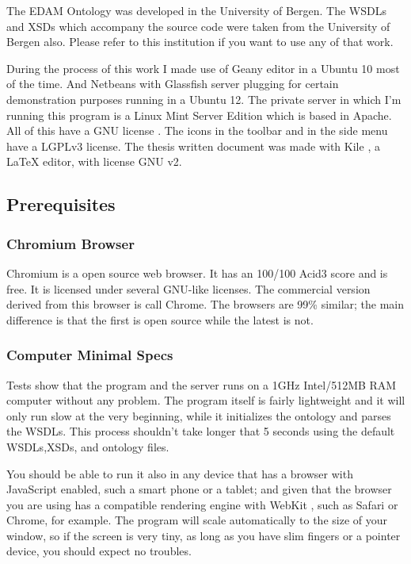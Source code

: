 \documentclass[a4paper,10pt]{article}
\begin{document}
  The EDAM Ontology was developed in the University of Bergen. The WSDLs and XSDs which accompany the source code were taken from the University of Bergen also. Please refer to this institution if you want to use any of that work.\vspace{3 mm}

  During the process of this work I made use of Geany \cite{geany} editor in a Ubuntu 10 \cite{ubuntu} most of the time. And Netbeans \cite{netbeans} with Glassfish \cite{glassfish} server plugging for certain demonstration purposes running in a Ubuntu 12. The private server in which I'm running this program is a Linux Mint Server Edition \cite{mint} which is based in Apache. All of this have a GNU license \cite{gpl}. The icons in the toolbar and in the side menu have a LGPLv3 \cite{lgpl} license. The thesis written document was made with Kile \cite{kile}, a LaTeX editor, with license GNU v2.\vspace{3 mm}

  \subsection{Prerequisites}
    \subsubsection{Chromium Browser}
    \label{sec:chromiumbrowser}

    Chromium \cite{chromium} is a open source web browser. It has an 100/100 Acid3 score and is free. It is licensed under several GNU-like licenses. The commercial version derived from this browser is call Chrome. The browsers are 99\% similar; the main difference is that the first is open source while the latest is not.

    \subsubsection{Computer Minimal Specs}

	Tests show that the program and the server runs on a 1GHz Intel/512MB RAM computer without any problem. The program itself is fairly lightweight and it will only run slow at the very beginning, while it initializes the ontology and parses the WSDLs. This process shouldn't take longer that 5 seconds using the default WSDLs,XSDs, and ontology files.\vspace{3 mm}

	You should be able to run it also in any device that has a browser with JavaScript enabled, such a smart phone or a tablet; and given that the browser you are using has a compatible rendering engine with WebKit \cite{webkit}, such as Safari \cite{safari} or Chrome, for example. The program will scale automatically to the size of your window, so if the screen is very tiny, as long as you have slim fingers or a pointer device, you should expect no troubles.
\end{document}
